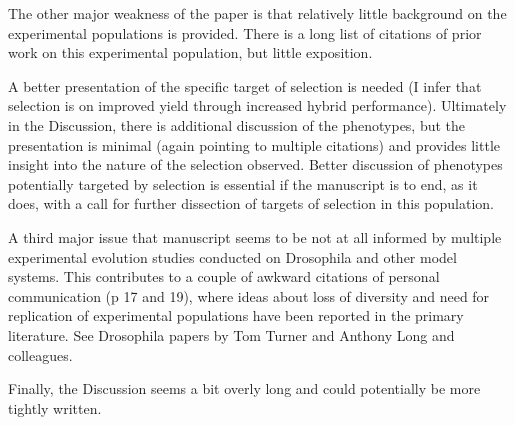 \documentclass[onecolumn,oneside,letterpaper]{article}
\begin{document}
The other major weakness of the paper is that relatively little background on the experimental populations 
is provided. There is a long list of citations of prior work on this experimental population, but little 
exposition.


A better presentation of the specific target of selection is needed (I infer that selection is on 
improved yield through increased hybrid performance). Ultimately in the Discussion, there is additional 
discussion of the phenotypes, but the presentation is minimal (again pointing to multiple citations) and 
provides little insight into the nature of the selection observed. Better discussion of phenotypes potentially 
targeted by selection is essential if the manuscript is to end, as it does, with a call for further dissection of 
targets of selection in this population.


A third major issue that manuscript seems to be not at all informed by multiple experimental evolution 
studies conducted on Drosophila and other model systems. This contributes to a couple of awkward 
citations of personal communication (p 17 and 19), where ideas about loss of diversity and need for 
replication of experimental populations have been reported in the primary literature. See Drosophila papers 
by Tom Turner and Anthony Long and colleagues.


Finally, the Discussion seems a bit overly long and could potentially be more tightly written.

\end{document}

